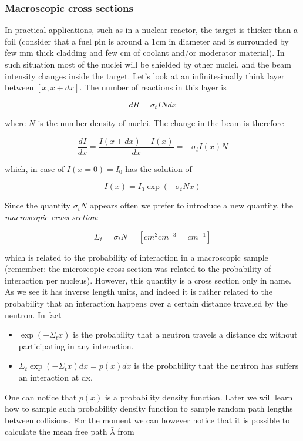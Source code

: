 \subsubsection{Macroscopic cross sections}

In practical applications, such as in a nuclear reactor, the target is thicker than a foil (consider that a fuel pin is around a 1cm in diameter and is surrounded by few mm thick cladding and few cm of coolant and/or moderator material). In such situation most of the nuclei will be shielded by other nuclei, and the beam intensity changes inside the target. Let's look at an infinitesimally think layer between $[x,x+dx]$. The number of reactions in this layer is

\[
dR=\sigma_t I N dx
\]

\noindent where $N$ is the number density of nuclei. The change in the beam is therefore

\[
\frac{dI}{dx}=\frac{I(x+dx)-I(x)}{dx}=-\sigma_tI(x)N
\]

\noindent which, in case of $I(x=0)=I_0$ has the solution of

\[
I(x)=I_0\exp(-\sigma_tNx)
\]

Since the quantity $\sigma_t N$ appears often we prefer to introduce a new quantity, the \textit{macroscopic cross section}:

\[
\Sigma_t=\sigma_tN=[cm^{2}cm^{-3}=cm^{-1}]
\] 

\noindent which is related to the probability of interaction in a macroscopic sample (remember: the microscopic cross section was related to the probability of interaction per nucleus). However, this quantity is a cross section only in name. As we see it has inverse length units, and indeed it is rather related to the probability that an interaction happens over a certain distance traveled by the neutron. In fact

\begin{itemize}
\item $\exp(-\Sigma_t x)$ is the probability that a neutron travels a distance dx without participating in any interaction.
\item $\Sigma_t \exp(-\Sigma_t x)dx=p(x)dx$ is the probability that the neutron has suffers an interaction at dx.
\end{itemize}

One can notice that $p(x)$ is a probability density function. Later we will learn how to sample such probability density function to sample random path lengths between collisions. For the moment we can however notice that it is possible to calculate the mean free path $\bar\lambda$ from

